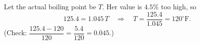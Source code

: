 Let the actual boiling point be $T$. Her value is $4.5\%$ too high, so
\[
125.4=1.045\,T\quad\Longrightarrow\quad T=\dfrac{125.4}{1.045}=\boxed{120^\circ\text{F}}.
\]
(Check: $\dfrac{125.4-120}{120}=\dfrac{5.4}{120}=0.045$.)
